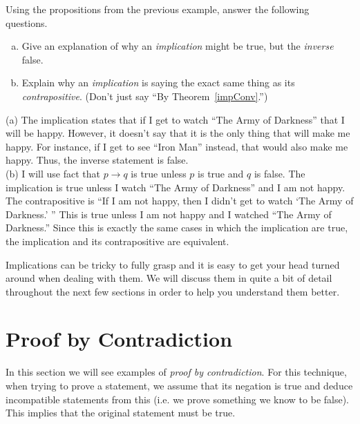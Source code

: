 \begin{ques}
Using the propositions from the previous example, answer the following questions.
\begin{enumerate}[(a)]
\item 
Give an explanation of why an {\em implication} might be true, but the {\em inverse} false.\\
\answerlinethree
\item
Explain why an {\em implication} is saying the exact same thing as its {\em contrapositive}.
(Don't just say ``By Theorem~\ref{impConv}.'')\\
\answerlinethree
\end{enumerate}
\begin{answer}
(a)
The implication states that if I get to watch ``The Army of Darkness'' that I will be happy.  However,
it doesn't say that it is the only thing that will make me happy.  
For instance, if I get to see ``Iron Man'' instead, that would also make me happy.  
Thus, the inverse statement is false.\\
(b)
I will use fact that $p\rightarrow q$ is true unless $p$ is true and $q$ is false.
The implication is true unless I watch ``The Army of Darkness'' and I am not happy.
The contrapositive is ``If I am not happy, then I didn't get to watch `The Army of Darkness.' ''
This is true unless I am not happy and I watched ``The Army of Darkness.''
Since this is exactly the same cases in which the implication are true, the implication
and its contrapositive are equivalent.
\end{answer}
\end{ques}


Implications can be tricky to fully grasp and it is easy to get your head turned around when dealing with them.
We will discuss them in quite a bit of detail throughout the next few sections in order to help
you understand them better.

\newpage
\section{Proof by Contradiction}\label{section:contradiction}

In this section we will see examples of {\em proof by contradiction}.
For this technique, when trying to prove a statement, we assume that its negation
is true and deduce incompatible statements from this (i.e. we prove something we know to be false).  
This implies that the original statement must be true.  

